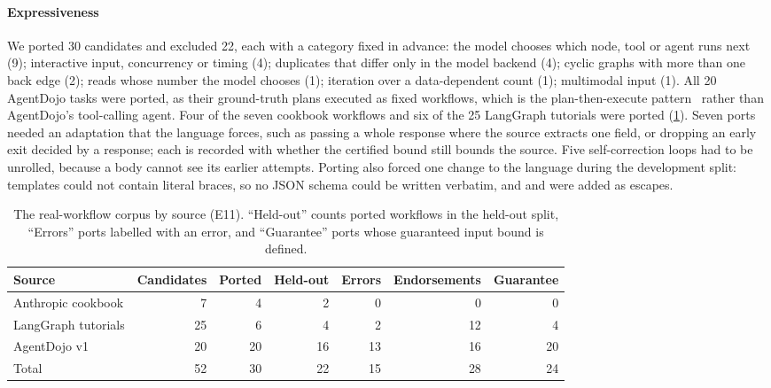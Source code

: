 \paragraph{Expressiveness} We ported 30 candidates and excluded 22, each with a
category fixed in advance: the model chooses which node, tool or agent runs next (9);
interactive input, concurrency or timing (4); duplicates that differ only in the model
backend (4); cyclic graphs with more than one back edge (2); reads whose number the
model chooses (1); iteration over a data-dependent count (1); multimodal input (1).
All 20 AgentDojo tasks were ported, as their ground-truth plans executed as fixed
workflows, which is the plan-then-execute pattern~\cite{beurerkellner2025design}
rather than AgentDojo's tool-calling agent. Four of the seven cookbook workflows and
six of the 25 LangGraph tutorials were ported (\cref{tab:corpus}). Seven ports needed
an adaptation that the language forces, such as passing a whole response where the
source extracts one field, or dropping an early exit decided by a response; each is
recorded with whether the certified bound still bounds the source. Five
self-correction loops had to be unrolled, because a  body cannot see its
earlier attempts. Porting also forced one change to the language during the
development split: templates could not contain literal braces, so no JSON schema could
be written verbatim, and \code{\{\{} and \code{\}\}} were added as escapes.

\begin{table}[t]
\centering
\caption{The real-workflow corpus by source (E11). ``Held-out'' counts ported
workflows in the held-out split, ``Errors'' ports labelled with an error, and ``Guarantee''
ports whose guaranteed input bound is defined.}
\label{tab:corpus}
\footnotesize\setlength{\tabcolsep}{4pt}
\begin{tabular}{@{}lrrrrrr@{}}
\toprule
Source & Candidates & Ported & Held-out & Errors & Endorsements & Guarantee \\
\midrule
Anthropic cookbook & 7 & 4 & 2 & 0 & 0 & 0 \\
LangGraph tutorials & 25 & 6 & 4 & 2 & 12 & 4 \\
AgentDojo v1 & 20 & 20 & 16 & 13 & 16 & 20 \\
\midrule
Total & 52 & 30 & 22 & 15 & 28 & 24 \\
\bottomrule
\end{tabular}
\end{table}

